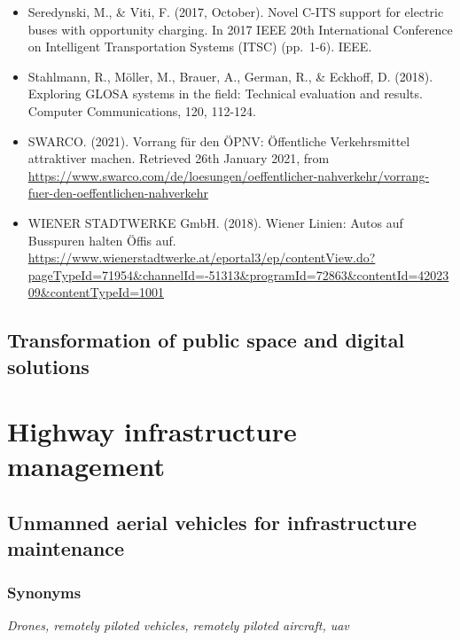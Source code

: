 \documentclass[
]{book}
\begin{document}
\begin{itemize}
\item
  Seredynski, M., \& Viti, F. (2017, October). Novel C-ITS support for electric buses with opportunity charging. In 2017 IEEE 20th International Conference on Intelligent Transportation Systems (ITSC) (pp.~1-6). IEEE.
\item
  Stahlmann, R., Möller, M., Brauer, A., German, R., \& Eckhoff, D. (2018). Exploring GLOSA systems in the field: Technical evaluation and results. Computer Communications, 120, 112-124.
\item
  SWARCO. (2021). Vorrang für den ÖPNV: Öffentliche Verkehrsmittel attraktiver machen. Retrieved 26th January 2021, from \url{https://www.swarco.com/de/loesungen/oeffentlicher-nahverkehr/vorrang-fuer-den-oeffentlichen-nahverkehr}
\item
  WIENER STADTWERKE GmbH. (2018). Wiener Linien: Autos auf Busspuren halten Öffis auf. \url{https://www.wienerstadtwerke.at/eportal3/ep/contentView.do?pageTypeId=71954\&channelId=-51313\&programId=72863\&contentId=4202309\&contentTypeId=1001}
\end{itemize}

\hypertarget{transformation-of-public-space-and-digital-solutions}{%
\section{Transformation of public space and digital solutions}\label{transformation-of-public-space-and-digital-solutions}}

\hypertarget{highway}{%
\chapter{Highway infrastructure management}\label{highway}}

\hypertarget{unmanned-aerial-vehicles-for-infrastructure-maintenance}{%
\section{Unmanned aerial vehicles for infrastructure maintenance}\label{unmanned-aerial-vehicles-for-infrastructure-maintenance}}

\hypertarget{synonyms-2}{%
\subsection*{Synonyms}\label{synonyms-2}}

\emph{Drones, remotely piloted vehicles, remotely piloted aircraft, uav}
\end{document}
